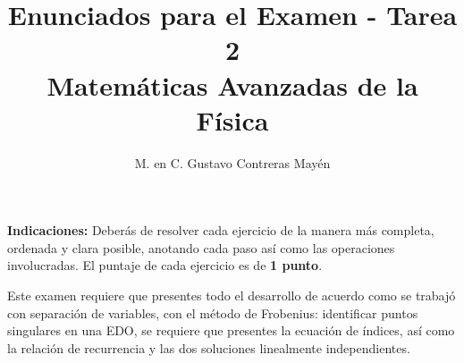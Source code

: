 
\title{Enunciados para el Examen - Tarea 2 \\[0.3em]  \large{Matemáticas Avanzadas de la Física}\vspace{-3ex}}
\author{M. en C. Gustavo Contreras Mayén}
\date{ }

\vspace{-4cm}
\maketitle
\fontsize{14}{14}\selectfont

\textbf{Indicaciones: } Deberás de resolver cada ejercicio de la manera más completa, ordenada y clara posible, anotando cada paso así como las operaciones involucradas. El puntaje de cada ejercicio es de \textbf{1 punto}.
\par
Este examen requiere que presentes todo el desarrollo de acuerdo como se trabajó con separación de variables, con el método de Frobenius: identificar puntos singulares en una EDO, se requiere que presentes la ecuación de índices, así como la relación de recurrencia y las dos soluciones linealmente independientes.

